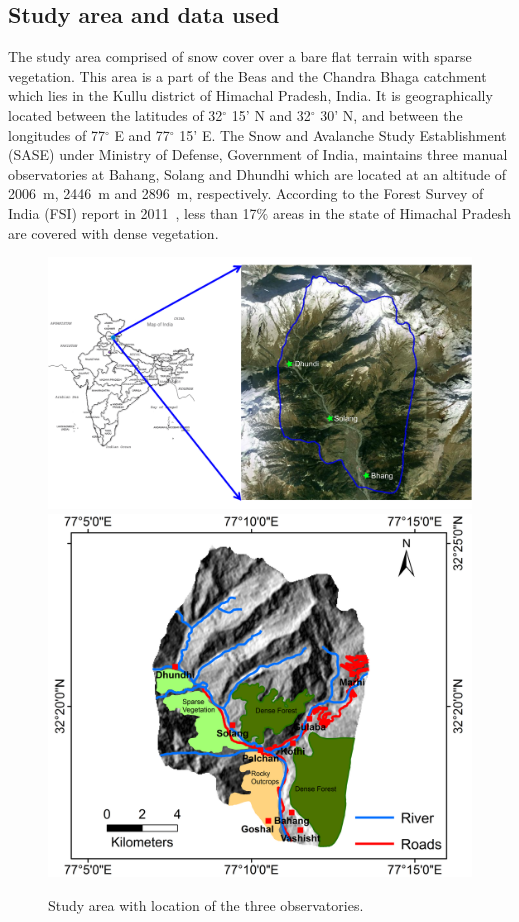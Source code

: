 \subsection{Study area and data used}
\label{sec:4.2.1}
The study area comprised of snow cover over a bare flat terrain with sparse vegetation. This area is a part of the Beas and the Chandra Bhaga catchment which lies in the Kullu district of Himachal Pradesh, India. It is geographically located between the latitudes of 32$^\circ$ 15' N and 32$^\circ$ 30' N, and between the longitudes of 77$^\circ$ E and 77$^\circ$ 15' E. The Snow and Avalanche Study Establishment (SASE) under Ministry of Defense, Government of India, maintains three manual observatories at Bahang, Solang and Dhundhi which are located at an altitude of 2006~m, 2446~m and 2896~m, respectively. According to the Forest Survey of India (FSI) report in 2011~\citep{FSI2011}, less than 17$\%$ areas in the state of Himachal Pradesh are covered with dense vegetation. 
\begin{figure}[!thpb]
	\centering
	\includegraphics[width=\columnwidth]{Figures/sa_final}
	\includegraphics[width=0.8\columnwidth]{Figure_General/Study}
	\caption [Study area of Manali-Dhundhi region, Himachal pradesh, India]{Study area with location of the three observatories.}
	\label{fig:study_area}
\end{figure}

